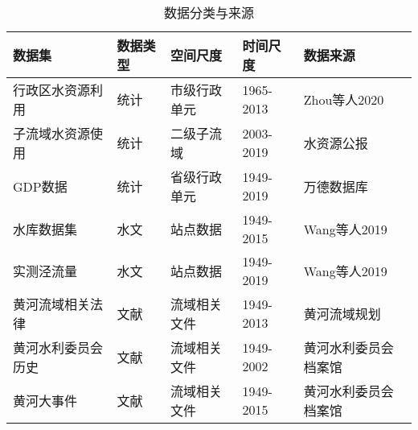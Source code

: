 \begin{table}[htbp]
    \centering
    \caption{数据分类与来源}
      \begin{tabularx}{\textwidth}{LLLLL}
      \toprule
      数据集   & 数据类型  & 空间尺度  & 时间尺度  & 数据来源 \\
      \midrule
      行政区水资源利用 & 统计    & 市级行政单元 & 1965-2013 & Zhou等人2020 \\
      子流域水资源使用 & 统计    & 二级子流域 & 2003-2019 & 水资源公报 \\
      GDP数据 & 统计    & 省级行政单元 & 1949-2019 & 万德数据库 \\
      水库数据集 & 水文    & 站点数据  & 1949-2015 & Wang等人2019 \\
      实测泾流量 & 水文    & 站点数据  & 1949-2019 & Wang等人2019 \\
      黄河流域相关法律 & 文献    & 流域相关文件 & 1949-2013 & 黄河流域规划 \\
      黄河水利委员会历史 & 文献    & 流域相关文件 & 1949-2002 & 黄河水利委员会档案馆 \\
      黄河大事件 & 文献    & 流域相关文件 & 1949-2015 & 黄河水利委员会档案馆 \\
      \bottomrule
      \end{tabularx}%
    \label{ch4:tab:data_source}%
\end{table}%
  